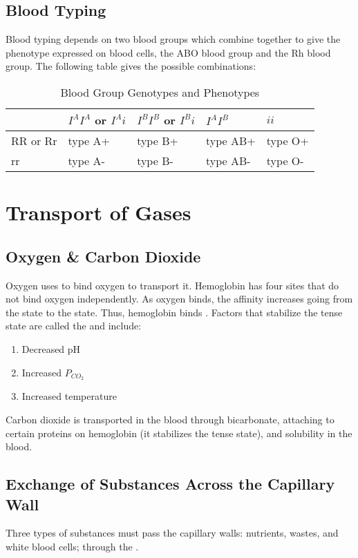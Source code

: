 \documentclass[../Bio_chemistryReview.tex]{subfiles}
\begin{document}
\subsection{Blood Typing}
Blood typing depends on two blood groups which combine together to give the
phenotype expressed on blood cells, the ABO blood group and the Rh blood group.
The following table gives the possible combinations:
\begin{table}[H]
  \centering
  \caption{Blood Group Genotypes and Phenotypes}
  \begin{tabularx}{0.8\textwidth}{XXXXX}
    \toprule
    & $ I^{A}I^{A} $ or $ I^{A}i $ & $ I^{B}I^{B} $ or $ I^{B}i $ & $
    I^{A}I^{B} $ & $ ii $\\
    \midrule
    RR or Rr & type A+ & type B+ & type AB+ & type O+\\
    rr & type A- & type B- & type AB- & type O-\\
    \bottomrule
  \end{tabularx}
\end{table}

\section{Transport of Gases}

\subsection{Oxygen \& Carbon Dioxide}
Oxygen uses  to bind oxygen to transport it. Hemoglobin has
four sites that do not bind oxygen independently. As oxygen binds, the affinity
increases going from the  state to the
 state. Thus, hemoglobin binds
. Factors that stabilize the tense state are
called the  and include:
\begin{enumerate}
  \item Decreased pH
  \item Increased $ P_{CO_{2}} $
  \item Increased temperature
\end{enumerate}
Carbon dioxide is transported in the blood through bicarbonate, attaching to
certain proteins on hemoglobin (it stabilizes the tense state), and solubility
in the blood.

\subsection{Exchange of Substances Across the Capillary Wall}
Three types of substances must pass the capillary walls: nutrients, wastes, and
white blood cells; through the .\par
\end{document}
